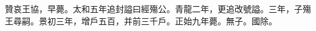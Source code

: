 \begin{pinyinscope}
 
 
 贊哀王協，早薨。太和五年追封謚曰經殤公。青龍二年，更追改號謚。三年，子殤王尋嗣。景初三年，增戶五百，并前三千戶。正始九年薨。無子。國除。
 
 
\end{pinyinscope}